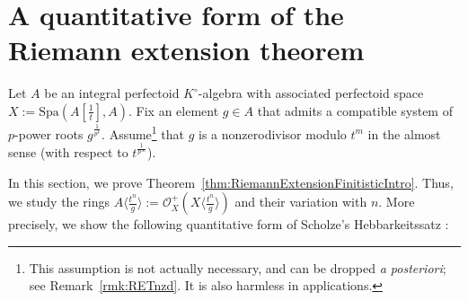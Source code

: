 \documentclass[10pt,reqno]{amsart}
\begin{document}
\section{A quantitative form of the Riemann extension theorem}
\label{sec:QuantRET}

\begin{notation}
\label{not:QuantRET}
Let $A$ be an integral perfectoid $K^\circ$-algebra with associated perfectoid space $X := \mathrm{Spa}(A[\frac{1}{t}],A)$. Fix an element $g \in A$ that admits a compatible system of $p$-power roots $g^{\frac{1}{p^k}}$. Assume\footnote{This assumption is not actually necessary, and can be dropped {\em a posteriori}; see Remark~\ref{rmk:RETnzd}. It is also harmless in applications.} that $g$ is a nonzerodivisor modulo $t^m$ in the almost sense (with respect to $t^{\frac{1}{p^\infty}}$). 
\end{notation}

In this section, we prove Theorem~\ref{thm:RiemannExtensionFinitisticIntro}. Thus, we study the rings $A \langle \frac{t^n}{g} \rangle := \mathcal{O}_X^+(X\langle \frac{t^n}{g} \rangle)$ and their variation with $n$. More precisely, we show the following quantitative form of Scholze's Hebbarkeitssatz \cite[Proposition II.3.2]{ScholzeTorsion}:
\end{document}
